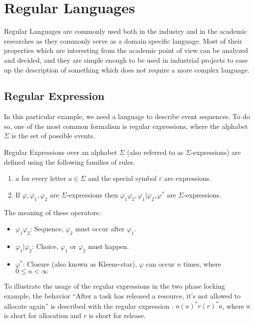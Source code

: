 	\section{Regular Languages}
	
		Regular Languages are commonly used both in the industry and in the academic researches as they commonly serve as a domain specific language.
		Most of their properties which are interesting from the academic point of view can be analyzed and decided, and they are simple enough to be used in industrial projects to ease up the description of something which does not require a more complex language.
	
		\subsection{Regular Expression}
		
			In this particular example, we need a language to describe event sequences. To do so, one of the most common formalism is regular expressions, where the alphabet $\Sigma$ is the set of possible events.
	
			
			\begin{dfn}
				\label{dfn:cep:re}
				Regular Expressions over an alphabet $\Sigma$ (also referred to as $\Sigma$-expressions)
				are defined using the following families of rules.
				\begin{enumerate}
					\item $a$ for every letter $a \in \Sigma$ and the special symbol $\varepsilon$ are expressions.
					\item If $\varphi, \varphi_1, \varphi_2$ are $\Sigma$-expressions then %
						$ %
						\varphi_1 \varphi_2,
						\varphi_1 | \varphi_2,
						\varphi^\ast
						$ are $\Sigma$-expressions\citep{tre}.
				\end{enumerate}
			\end{dfn}
	
			The meaning of these operators:
			\begin{itemize}
				\item $\varphi_1 \varphi_2$: Sequence, $\varphi_2$ must occur after $\varphi_1$.
				\item $\varphi_1 | \varphi_2$: Choice, $\varphi_1$ or $\varphi_2$ must happen.
				\item $\varphi^\ast$: Closure (also known as Kleene-star), $\varphi$ can occur $n$ times, where $0 \leq n < \infty$
			\end{itemize}
			
	
			To illustrate the usage of the regular expressions in the two phase locking example, the behavior ``After a task has released a resource, it's not allowed to allocate again'' is described with the regular expression : $a (a)^* r (r)^* a $, where $a$ is short for allocation and $r$ is short for release.
	
